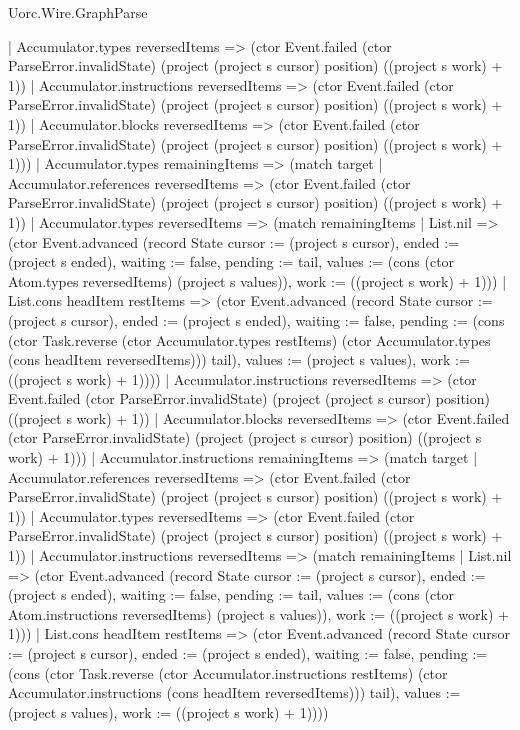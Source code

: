\begin{lexlean}{Uorc.Wire.GraphParse}
\begin{semanticmodule}
{          | Accumulator.types reversedItems => (ctor Event.failed (ctor ParseError.invalidState) (project (project s cursor) position) ((project s work) + 1))
          | Accumulator.instructions reversedItems => (ctor Event.failed (ctor ParseError.invalidState) (project (project s cursor) position) ((project s work) + 1))
          | Accumulator.blocks reversedItems => (ctor Event.failed (ctor ParseError.invalidState) (project (project s cursor) position) ((project s work) + 1)))
        | Accumulator.types remainingItems => (match target
          | Accumulator.references reversedItems => (ctor Event.failed (ctor ParseError.invalidState) (project (project s cursor) position) ((project s work) + 1))
          | Accumulator.types reversedItems => (match remainingItems
            | List.nil => (ctor Event.advanced (record State {cursor := (project s cursor), ended := (project s ended), waiting := false, pending := tail, values := (cons (ctor Atom.types reversedItems) (project s values)), work := ((project s work) + 1)}))
            | List.cons headItem restItems => (ctor Event.advanced (record State {cursor := (project s cursor), ended := (project s ended), waiting := false, pending := (cons (ctor Task.reverse (ctor Accumulator.types restItems) (ctor Accumulator.types (cons headItem reversedItems))) tail), values := (project s values), work := ((project s work) + 1)})))
          | Accumulator.instructions reversedItems => (ctor Event.failed (ctor ParseError.invalidState) (project (project s cursor) position) ((project s work) + 1))
          | Accumulator.blocks reversedItems => (ctor Event.failed (ctor ParseError.invalidState) (project (project s cursor) position) ((project s work) + 1)))
        | Accumulator.instructions remainingItems => (match target
          | Accumulator.references reversedItems => (ctor Event.failed (ctor ParseError.invalidState) (project (project s cursor) position) ((project s work) + 1))
          | Accumulator.types reversedItems => (ctor Event.failed (ctor ParseError.invalidState) (project (project s cursor) position) ((project s work) + 1))
          | Accumulator.instructions reversedItems => (match remainingItems
            | List.nil => (ctor Event.advanced (record State {cursor := (project s cursor), ended := (project s ended), waiting := false, pending := tail, values := (cons (ctor Atom.instructions reversedItems) (project s values)), work := ((project s work) + 1)}))
            | List.cons headItem restItems => (ctor Event.advanced (record State {cursor := (project s cursor), ended := (project s ended), waiting := false, pending := (cons (ctor Task.reverse (ctor Accumulator.instructions restItems) (ctor Accumulator.instructions (cons headItem reversedItems))) tail), values := (project s values), work := ((project s work) + 1)})))
}
\end{semanticmodule}
\end{lexlean}
